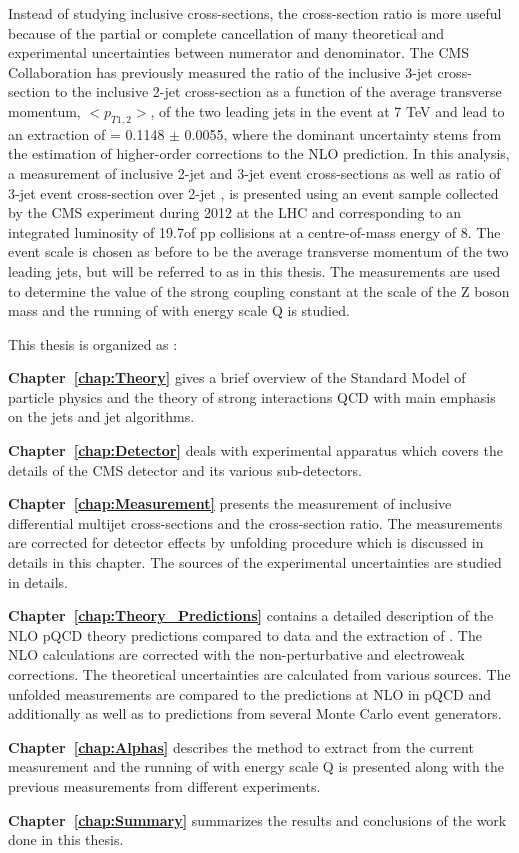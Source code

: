 Instead of studying inclusive cross-sections, the cross-section ratio is more useful because of the partial or complete cancellation of many theoretical and experimental uncertainties between numerator and denominator. The CMS Collaboration has previously measured the ratio of the inclusive 3-jet cross-section to the inclusive 2-jet cross-section as a function of the average transverse momentum, $<p_{T1,2}>$, of the two leading jets in the event at 7 TeV \cite {Chatrchyan:2013txa} and lead to an extraction of \alpsmz = 0.1148 $\pm$ 0.0055, where the dominant uncertainty stems from the estimation of higher-order corrections to the NLO prediction. In this analysis, a measurement of inclusive 2-jet and 3-jet event cross-sections as well as ratio of 3-jet event cross-section over 2-jet \ratio, is presented using an event sample collected by the CMS experiment during 2012 at the LHC and corresponding to an integrated luminosity of 19.7\fbinv of pp collisions at a centre-of-mass energy of 8\TeV. The event scale is chosen as before to be the average transverse momentum of the two leading jets, but will be referred to as \httwo in this thesis. The measurements are used to determine the value of the strong coupling constant at the scale of the Z boson mass \alpsmz and the running of \alps with energy scale Q is studied.

This thesis is organized as :

{\bf Chapter~\ref{chap:Theory}} gives a brief overview of the Standard Model of particle physics and the theory of strong interactions QCD with main emphasis on the jets and jet algorithms. 

{\bf Chapter~\ref{chap:Detector}} deals with experimental apparatus which covers the details of the CMS detector and its various sub-detectors.

{\bf Chapter~\ref{chap:Measurement}} presents the measurement of inclusive differential multijet cross-sections and the cross-section ratio. The measurements are corrected for detector effects by unfolding procedure which is discussed in details in this chapter. The sources of the experimental uncertainties are studied in details. 

{\bf Chapter~\ref{chap:Theory_Predictions}} contains a detailed description of the NLO pQCD theory predictions compared to data and the extraction of \alps. The NLO calculations are corrected with the non-perturbative and electroweak corrections. The theoretical uncertainties are calculated from various sources. The unfolded measurements are compared to the predictions at NLO in pQCD and additionally as well as to predictions from several Monte Carlo event generators.  

{\bf Chapter~\ref{chap:Alphas}} describes the method to extract \alpsmz from the current measurement and the running of \alps with energy scale Q is presented along with the previous measurements from different experiments.

{\bf Chapter~\ref{chap:Summary}} summarizes the results and conclusions of the work done in this thesis.

